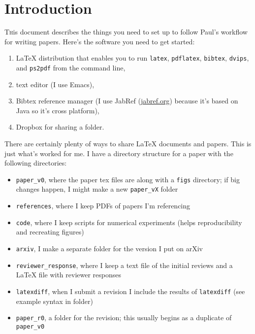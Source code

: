 \section{Introduction}
\label{sec:intro}

\lettrine{T}his document describes the things you need to set up to follow Paul's workflow for writing papers. Here's the software you need to get started:
\begin{enumerate}
\item LaTeX distribution that enables you to run \texttt{latex}, \texttt{pdflatex}, \texttt{bibtex}, \texttt{dvips}, and \texttt{ps2pdf} from the command line,
\item text editor (I use Emacs),
\item Bibtex reference manager (I use JabRef (\url{jabref.org}) because it's based on Java so it's cross platform),
\item Dropbox for sharing a folder.
\end{enumerate}
There are certainly plenty of ways to share LaTeX documents and papers. This is just what's worked for me. I have a directory structure for a paper with the following directories:
\begin{itemize}
\item \texttt{paper\_v0}, where the paper tex files are along with a \texttt{figs} directory; if big changes happen, I might make a new \texttt{paper\_vX} folder
\item \texttt{references}, where I keep PDFs of papers I'm referencing
\item \texttt{code}, where I keep scripts for numerical experiments (helps reproducibility and recreating figures)
\item \texttt{arxiv}, I make a separate folder for the version I put on arXiv
\item \texttt{reviewer\_response}, where I keep a text file of the initial reviews and a LaTeX file with reviewer responses
\item \texttt{latexdiff}, when I submit a revision I include the results of \texttt{latexdiff} (see example syntax in folder)
\item \texttt{paper\_r0}, a folder for the revision; this usually begins as a duplicate of \texttt{paper\_v0}
\end{itemize}